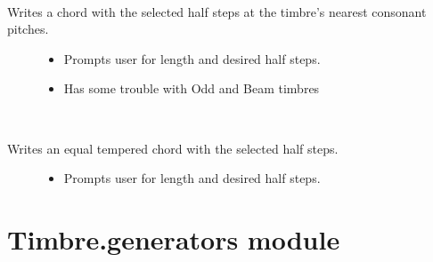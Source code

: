 \documentclass[letterpaper,10pt,english]{sphinxmanual}
\begin{document}
\begin{fulllineitems}
\begin{fulllineitems}
\end{fulllineitems}


\begin{fulllineitems}
\label{index:Timbre.timbre.Timbre.writeConsonantChord}~\begin{description}
\item[{Writes a chord with the selected half steps at the timbre's nearest consonant pitches. }] \leavevmode\begin{itemize}
\item {} 
Prompts user for length and desired half steps.

\item {} 
Has some trouble with Odd and Beam timbres

\end{itemize}

\end{description}

\end{fulllineitems}


\begin{fulllineitems}
\label{index:Timbre.timbre.Timbre.writeEqTempChord}~\begin{description}
\item[{Writes an equal tempered chord with the selected half steps. }] \leavevmode\begin{itemize}
\item {} 
Prompts user for length and desired half steps.

\end{itemize}

\end{description}

\end{fulllineitems}


\end{fulllineitems}



\chapter{Timbre.generators module}
\label{index:module-Timbre.generators}\label{index:timbre-generators-module}
\end{document}
